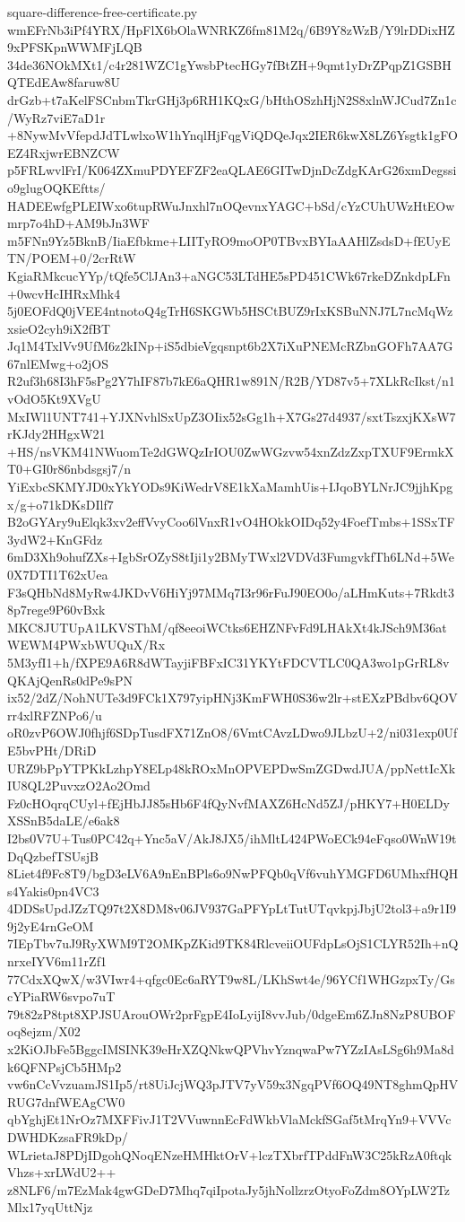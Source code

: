 \documentclass[11pt]{article}
\theoremstyle{definition}
\theoremstyle{remark}
\begin{document}
\begin{filecontents*}[overwrite]{square-difference-free-certificate.py}
wmEFrNb3iPf4YRX/HpFlX6bOlaWNRKZ6fm81M2q/6B9Y8zWzB/Y9lrDDixHZ9xPFSKpnWWMFjLQB
34de36NOkMXt1/c4r281WZC1gYwsbPtecHGy7fBtZH+9qmt1yDrZPqpZ1GSBHQTEdEAw8faruw8U
drGzb+t7aKelFSCnbmTkrGHj3p6RH1KQxG/bHthOSzhHjN2S8xlnWJCud7Zn1c/WyRz7viE7aD1r
+8NywMvVfepdJdTLwlxoW1hYnqlHjFqgViQDQeJqx2IER6kwX8LZ6Ysgtk1gFOEZ4RxjwrEBNZCW
p5FRLwvlFrI/K064ZXmuPDYEFZF2eaQLAE6GITwDjnDcZdgKArG26xmDegssio9glugOQKEftts/
HADEEwfgPLEIWxo6tupRWuJnxhl7nOQevnxYAGC+bSd/cYzCUhUWzHtEOwmrp7o4hD+AM9bJn3WF
m5FNn9Yz5BknB/IiaEfbkme+LIITyRO9moOP0TBvxBYIaAAHlZsdsD+fEUyETN/POEM+0/2crRtW
KgiaRMkcucYYp/tQfe5ClJAn3+aNGC53LTdHE5sPD451CWk67rkeDZnkdpLFn+0wcvHcIHRxMhk4
5j0EOFdQ0jVEE4ntnotoQ4gTrH6SKGWb5HSCtBUZ9rIxKSBuNNJ7L7ncMqWzxsieO2cyh9iX2fBT
Jq1M4TxlVv9UfM6z2kINp+iS5dbieVgqsnpt6b2X7iXuPNEMcRZbnGOFh7AA7G67nlEMwg+o2jOS
R2uf3h68I3hF5sPg2Y7hIF87b7kE6aQHR1w891N/R2B/YD87v5+7XLkRcIkst/n1vOdO5Kt9XVgU
MxIWl1UNT741+YJXNvhlSxUpZ3OIix52sGg1h+X7Gs27d4937/sxtTszxjKXsW7rKJdy2HHgxW21
+HS/nsVKM41NWuomTe2dGWQzIrIOU0ZwWGzvw54xnZdzZxpTXUF9ErmkXT0+GI0r86nbdsgsj7/n
YiExbcSKMYJD0xYkYODs9KiWedrV8E1kXaMamhUis+IJqoBYLNrJC9jjhKpgx/g+o71kDKsDIlf7
B2oGYAry9uElqk3xv2effVvyCoo6lVnxR1vO4HOkkOIDq52y4FoefTmbs+1SSxTF3ydW2+KnGFdz
6mD3Xh9ohufZXs+IgbSrOZyS8tIji1y2BMyTWxl2VDVd3FumgvkfTh6LNd+5We0X7DTI1T62xUea
F3sQHbNd8MyRw4JKDvV6HiYj97MMq7I3r96rFuJ90EO0o/aLHmKuts+7Rkdt38p7rege9P60vBxk
MKC8JUTUpA1LKVSThM/qf8eeoiWCtks6EHZNFvFd9LHAkXt4kJSch9M36atWEWM4PWxbWUQuX/Rx
5M3yfI1+h/fXPE9A6R8dWTayjiFBFxIC31YKYtFDCVTLC0QA3wo1pGrRL8vQKAjQenRs0dPe9sPN
ix52/2dZ/NohNUTe3d9FCk1X797yipHNj3KmFWH0S36w2lr+stEXzPBdbv6QOVrr4xlRFZNPo6/u
oR0zvP6OWJ0fhjf6SDpTusdFX71ZnO8/6VmtCAvzLDwo9JLbzU+2/ni031exp0UfE5bvPHt/DRiD
URZ9bPpYTPKkLzhpY8ELp48kROxMnOPVEPDwSmZGDwdJUA/ppNettIcXkIU8QL2PuvxzO2Ao2Omd
Fz0cHOqrqCUyl+fEjHbJJ85sHb6F4fQyNvfMAXZ6HcNd5ZJ/pHKY7+H0ELDyXSSnB5daLE/e6ak8
I2bs0V7U+Tus0PC42q+Ync5aV/AkJ8JX5/ihMltL424PWoECk94eFqso0WnW19tDqQzbefTSUsjB
8Liet4f9Fc8T9/bgD3eLV6A9nEnBPls6o9NwPFQb0qVf6vuhYMGFD6UMhxfHQHs4Yakis0pn4VC3
4DDSsUpdJZzTQ97t2X8DM8v06JV937GaPFYpLtTutUTqvkpjJbjU2tol3+a9r1I99j2yE4rnGeOM
7IEpTbv7uJ9RyXWM9T2OMKpZKid9TK84RlcveiiOUFdpLsOjS1CLYR52Ih+nQnrxeIYV6m11rZf1
77CdxXQwX/w3VIwr4+qfgc0Ec6aRYT9w8L/LKhSwt4e/96YCf1WHGzpxTy/GscYPiaRW6svpo7uT
79t82zP8tpt8XPJSUArouOWr2prFgpE4IoLyijI8vvJub/0dgeEm6ZJn8NzP8UBOFoq8ejzm/X02
x2KiOJbFe5BggcIMSINK39eHrXZQNkwQPVhvYznqwaPw7YZzIAsLSg6h9Ma8dk6QFNPsjCb5HMp2
vw6nCcVvzuamJS1Ip5/rt8UiJcjWQ3pJTV7yV59x3NgqPVf6OQ49NT8ghmQpHVRUG7dnfWEAgCW0
qbYghjEt1NrOz7MXFFivJ1T2VVuwnnEcFdWkbVlaMckfSGaf5tMrqYn9+VVVcDWHDKzsaFR9kDp/
WLrietaJ8PDjIDgohQNoqENzeHMHktOrV+lczTXbrfTPddFnW3C25kRzA0ftqkVhzs+xrLWdU2++
z8NLF6/m7EzMak4gwGDeD7Mhq7qiIpotaJy5jhNollzrzOtyoFoZdm8OYpLW2TzMlx17yqUttNjz

\end{filecontents*}
\end{document}
